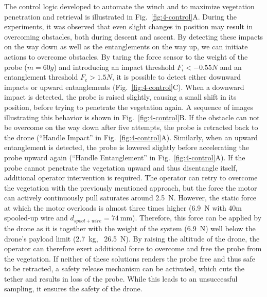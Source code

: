 The control logic developed to automate the winch and to maximize vegetation penetration and retrieval is illustrated in Fig.~\ref{fig:4-control}A. During the experiments, it was observed that even slight changes in position may result in overcoming obstacles, both during descent and ascent. By detecting these impacts on the way down as well as the entanglements on the way up, we can initiate actions to overcome obstacles. By taring the force sensor to the weight of the probe ($m = 60g$) and introducing an impact threshold $F_i < -0.55N$ and an entanglement threshold $F_e > 1.5N$, it is possible to detect either downward impacts or upward entanglements (Fig.~\ref{fig:4-control}C). When a downward impact is detected, the probe is raised slightly, causing a small shift in its position, before trying to penetrate the vegetation again. A sequence of images illustrating this behavior is shown in Fig.~\ref{fig:4-control}B. If the obstacle can not be overcome on the way down after five attempts, the probe is retracted back to the drone (“Handle Impact” in Fig.~\ref{fig:4-control}A). Similarly, when an upward entanglement is detected, the probe is lowered slightly before accelerating the probe upward again (“Handle Entanglement” in Fig.~\ref{fig:4-control}A). If the probe cannot penetrate the vegetation upward and thus disentangle itself, additional operator intervention is required. %
%
The operator can retry to overcome the vegetation with the previously mentioned approach, but the force the motor can actively continuously pull saturates around \SI{2.5}{\newton}. However, the static force at which the motor overloads is almost three times higher (\SI{6.9}{\newton} with 40m spooled-up wire and $d_{spool+wire} = \SI{74}{\milli\metre}$). Therefore, this force can be applied by the drone as it is together with the weight of the system (\SI{6.9}{\newton}) well below the drone's payload limit (\SI{2.7}{\kilo\gram}, ~\SI{26.5}{\newton}). By raising the altitude of the drone, the operator can therefore exert additional force to overcome and free the probe from the vegetation. If neither of these solutions renders the probe free and thus safe to be retracted, a safety release mechanism can be activated, which cuts the tether and results in loss of the probe. While this leads to an unsuccessful sampling, it ensures the safety of the drone.

